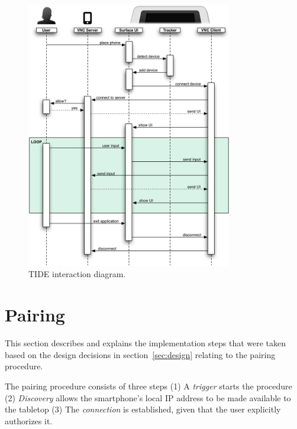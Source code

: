 \begin{figure}[htb]
  \centering
    \includegraphics[width=0.8\textwidth]{images/sequenceOverview}
    \caption{TIDE interaction diagram.}
    \label{fig:sequenceOverview}
\end{figure}



\section{Pairing}
\label{sec:pairing}

This section describes and explains the implementation steps that were taken based on the design decisions in section~\ref{sec:design} relating to the pairing procedure.


The pairing procedure consists of three steps
(1) A \emph{trigger} starts the procedure
(2) \emph{Discovery} allows the smartphone's local IP address to be made available to the tabletop
(3) The \emph{connection} is established, given that the user explicitly authorizes it.

